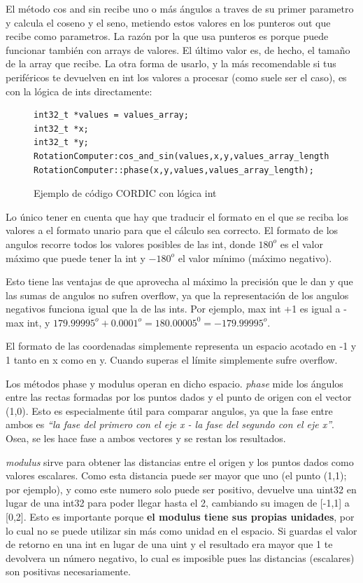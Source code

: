 \documentclass{report}
\begin{document}
\par \vspace{0.3cm}
El método cos and sin recibe uno o más ángulos a traves de su primer parametro y calcula el coseno y el seno, metiendo estos valores en los punteros out que recibe como parametros. La razón por la que usa punteros es porque puede funcionar también con arrays de valores. El último valor es, de hecho, el tamaño de la array que recibe. La otra forma de usarlo, y la más recomendable si tus periféricos te devuelven en int los valores a procesar (como suele ser el caso), es con la lógica de ints directamente:
\begin{figure}[h]
\begin{lstlisting}
int32_t *values = values_array;
int32_t *x;
int32_t *y;
RotationComputer:cos_and_sin(values,x,y,values_array_length);
RotationComputer::phase(x,y,values,values_array_length);
\end{lstlisting}
\caption{Ejemplo de código CORDIC con lógica int}
  \label{CORDICwIntcode}
\end{figure}
\par \vspace{0.3cm}
Lo único tener en cuenta que hay que traducir el formato en el que se reciba los valores a el formato unario para que el cálculo sea correcto. El formato de los angulos recorre todos los valores posibles de las int, donde $180^o$ es el valor máximo que puede tener la int y $-180^o$ el valor mínimo (máximo negativo). \par
Esto tiene las ventajas de que aprovecha al máximo la precisión que le dan y que las sumas de angulos no sufren overflow, ya que la representación de los angulos negativos funciona igual que la de las ints. Por ejemplo, max int +1 es igual a -max int, y $179.99995^o + 0.0001^o = 180.00005^0 = -179.99995^o$. \par
El formato de las coordenadas simplemente representa un espacio acotado en -1 y 1 tanto en x como en y. Cuando superas el límite simplemente sufre overflow. \par \vspace{0.3cm}
Los métodos phase y modulus operan en dicho espacio. \textit{phase} mide los ángulos entre las rectas formadas por los puntos dados y el punto de origen con el vector (1,0). Esto es especialmente útil para comparar angulos, ya que la fase entre ambos es \textit{``la fase del primero con el eje x - la fase del segundo con el eje x''}. Osea, se les hace fase a ambos vectores y se restan los resultados. \par
\textit{modulus} sirve para obtener las distancias entre el origen y los puntos dados como valores escalares. Como esta distancia puede ser mayor que uno (el punto (1,1); por ejemplo), y como este numero solo puede ser positivo, devuelve una uint32 en lugar de una int32 para poder llegar hasta el 2, cambiando su imagen de [-1,1] a [0,2]. Esto es importante porque \textbf{el modulus tiene sus propias unidades}, por lo cual no se puede utilizar sin más como unidad en el espacio. Si guardas el valor de retorno en una int en lugar de una uint y el resultado era mayor que 1 te devolvera un número negativo, lo cual es imposible pues las distancias (escalares) son positivas necesariamente. 
\end{document}
